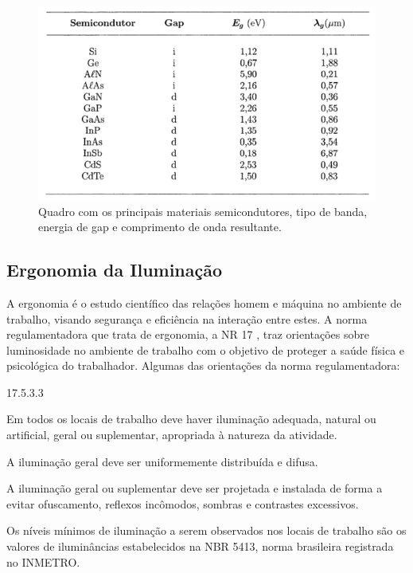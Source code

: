 
\begin{figure}[ht]
    \begin{center}
    \includegraphics{figuras/semic.PNG}
    \end{center}
    \caption[Quadro de energias de gap e comprimentos de onda.]{Quadro com os principais materiais semicondutores, tipo de banda, energia de gap e comprimento de onda resultante.}
    \label{semicon}
\end{figure}

\subsection{Ergonomia da Iluminação}

A ergonomia é o estudo científico das relações homem e máquina no ambiente de trabalho, visando segurança e eficiência na interação entre estes. A norma regulamentadora que trata de ergonomia, a NR 17 \cite{norma}, traz orientações sobre luminosidade no ambiente de trabalho com o objetivo de proteger a saúde física e psicológica do trabalhador. Algumas das orientações da norma regulamentadora:

\begin{labeling}{17.5.3.3}
    \item[17.5.3] Em todos os locais de trabalho deve haver iluminação adequada, natural ou artificial, geral ou suplementar, apropriada à natureza da atividade.
    \item[17.5.3.1]  A iluminação geral deve ser uniformemente distribuída e difusa.
    \item[17.5.3.2] A iluminação geral ou suplementar deve ser projetada e instalada de forma a evitar ofuscamento, reflexos incômodos, sombras e contrastes excessivos.
    \item[17.5.3.3] Os níveis mínimos de iluminação a serem observados nos locais de trabalho são os valores de iluminâncias estabelecidos na NBR 5413, norma brasileira registrada no INMETRO.
\end{labeling}

